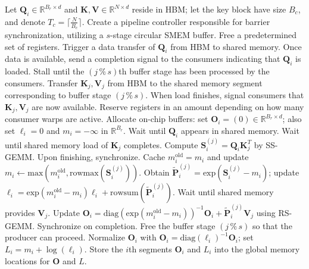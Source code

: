 \begin{algorithm}[H]
    \caption{\small\label{alg:flash3_wgmma_ws_only}\textsc{FlashAttention-3} forward pass \textbf{without} intra-consumer overlapping -- CTA view}
    \begin{algorithmic}[1]
\REQUIRE Let $\mathbf{Q}_i \in \mathbb{R}^{B_r \times d}$ and $\mathbf{K}, \mathbf{V} \in \mathbb{R}^{N \times d}$ reside in HBM; let the key block have size $B_c$, and denote $T_c = \lceil \frac{N}{B_c} \rceil$.
\STATE Create a pipeline controller responsible for barrier synchronization, utilizing a $s$-stage circular SMEM buffer.
\STATE Free a predetermined set of registers.
\STATE Trigger a data transfer of $\mathbf{Q}_i$ from HBM to shared memory.
\STATE Once data is available, send a completion signal to the consumers indicating that $\mathbf{Q}_i$ is loaded.
    \STATE Stall until the $(j\,\%\,s)$th buffer stage has been processed by the consumers.
    \STATE Transfer $\mathbf{K}_j, \mathbf{V}_j$ from HBM to the shared memory segment corresponding to buffer stage $(j\,\%\,s)$.
    \STATE When load finishes, signal consumers that $\mathbf{K}_j, \mathbf{V}_j$ are now available.
\ENDFOR
\ELSE \STATE Reserve registers in an amount depending on how many consumer warps are active.
\STATE Allocate on-chip buffers: set $\mathbf{O}_i = (0) \in \mathbb{R}^{B_r \times d}$; also set $\ell_i = 0$ and $m_i = -\infty$ in $\mathbb{R}^{B_r}$.
\STATE Wait until $\mathbf{Q}_i$ appears in shared memory.
\STATE Wait until shared memory load of $\mathbf{K}_j$ completes.
\STATE Compute $\mathbf{S}_i^{(j)} = \mathbf{Q}_i \mathbf{K}_j^T$ by SS-GEMM. Upon finishing, synchronize. \label{alg:ws_only_gemm1}
\STATE Cache $m_i^{\mathrm{old}} = m_i$ and update $m_i \leftarrow \mathrm{max}(m_i^{\mathrm{old}}, \mathrm{rowmax}(\mathbf{S}_i^{(j)}))$. \label{code-ws:softmax_start}
\STATE Obtain $\widetilde{\mathbf{P}}_i^{(j)} = \mathrm{exp}(\mathbf{S}_i^{(j)} - m_i)$; update $\ell_i = \mathrm{exp}(m_i^{\mathrm{old}} - m_i) \ell_i + \mathrm{rowsum}(\widetilde{\mathbf{P}}_i^{(j)})$. \label{code-ws:softmax_end}
\STATE Wait until shared memory provides $\mathbf{V}_j$.
\STATE Update $\mathbf{O}_i = \mathrm{diag}(\mathrm{exp}(m_i^{\mathrm{old}} - m_i))^{-1} \mathbf{O}_i + \widetilde{\mathbf{P}}_i^{(j)} \mathbf{V}_j$ using RS-GEMM. Synchronize on completion. \label{alg:ws_only_gemm2}
\STATE Free the buffer stage $(j\,\%\,s)$ so that the producer can proceed.
\ENDFOR
\STATE Normalize $\mathbf{O}_i$ with $\mathbf{O}_i = \mathrm{diag}(\ell_i)^{-1} \mathbf{O}_i$; set $L_i = m_i + \log(\ell_i)$.
\STATE Store the $i$th segments $\mathbf{O}_i$ and $L_i$ into the global memory locations for $\mathbf{O}$ and $L$.
\ENDIF
\end{algorithmic}
\end{algorithm}

